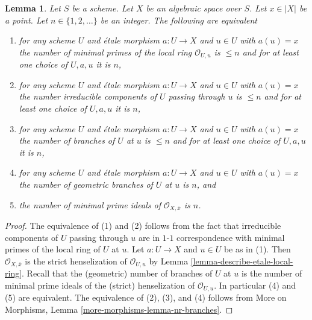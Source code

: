 \documentclass[10pt,a4paper]{amsart}
\theoremstyle{plain}
\newtheorem{lemma}[subsection]{Lemma}
\theoremstyle{definition}
\theoremstyle{remark}
\numberwithin{equation}{subsection}
\begin{document}
\begin{lemma}
\label{lemma-nr-branches-local-ring}
Let $S$ be a scheme. Let $X$ be an algebraic space over $S$.
Let $x \in |X|$ be a point. Let $n \in \{1, 2, \ldots\}$ be an integer.
The following are equivalent
\begin{enumerate}
\item for any scheme $U$ and \'etale morphism $a : U \to X$ and
$u \in U$ with $a(u) = x$ the number of minimal primes
of the local ring $\mathcal{O}_{U, u}$ is $\leq n$
and for at least one choice of $U, a, u$ it is $n$,
\item for any scheme $U$ and \'etale morphism $a : U \to X$ and
$u \in U$ with $a(u) = x$ the number irreducible components of
$U$ passing through $u$ is $\leq n$ and for at least one choice
of $U, a, u$ it is $n$,
\item for any scheme $U$ and \'etale morphism $a : U \to X$ and $u \in U$
with $a(u) = x$ the number of branches of $U$ at $u$ is $\leq n$
and for at least one choice of $U, a, u$ it is $n$,
\item for any scheme $U$ and \'etale morphism $a : U \to X$ and $u \in U$
with $a(u) = x$ the number of geometric branches of $U$ at $u$ is $n$, and
\item the number of minimal prime ideals of
$\mathcal{O}_{X, \overline{x}}$ is $n$.
\end{enumerate}
\end{lemma}

\begin{proof}
The equivalence of (1) and (2) follows from the fact that irreducible
components of $U$ passing through $u$ are in $1$-$1$ correspondence with
minimal primes of the local ring of $U$ at $u$. Let $a : U \to X$ and
$u \in U$ be as in (1). Then $\mathcal{O}_{X, \overline{x}}$ is the
strict henselization of $\mathcal{O}_{U, u}$ by
Lemma \ref{lemma-describe-etale-local-ring}. Recall that
the (geometric) number of branches of $U$ at $u$ is the number
of minimal prime ideals of the (strict) henselization of $\mathcal{O}_{U, u}$.
In particular (4) and (5) are equivalent.
The equivalence of (2), (3), and (4) follows from
More on Morphisms, Lemma \ref{more-morphisms-lemma-nr-branches}.
\end{proof}
\end{document}

